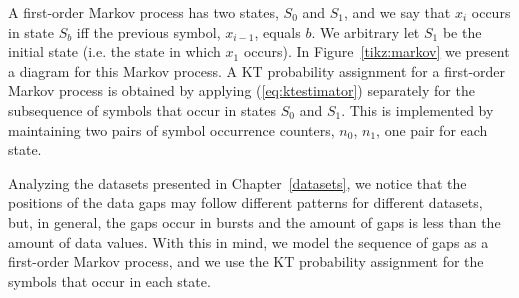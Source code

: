 \vspace{+5pt}
\begin{table}[h]
\begin{minipage}{0.62\textwidth}
A first-order Markov process has two states, $S_0$ and $S_1$, and we say that $x_i$ occurs in state $S_b$ iff the previous symbol, $x_{i-1}$, equals $b$. We arbitrary let $S_1$ be the initial state (i.e. the state in which $x_1$ occurs). In Figure~\ref{tikz:markov} we present a diagram for this Markov process. A KT probability assignment for a first-order Markov process is obtained by applying (\ref{eq:ktestimator}) separately for the subsequence of symbols that occur in states $S_0$ and $S_1$. This is implemented by maintaining two pairs of symbol occurrence counters, $n_0$, $n_1$, one pair for each state.

\end{minipage}%
\hspace{0.02\textwidth}
\begin{minipage}{0.32\textwidth}

\end{minipage}%
\end{table}


Analyzing the datasets presented in Chapter~\ref{datasets}, we notice that the positions of the data gaps may follow different patterns for different datasets, but, in general, the gaps occur in bursts and the amount of gaps is less than the amount of data values. With this in mind, we model the sequence of gaps as a first-order Markov process, and we use the KT probability assignment for the symbols that occur in each state.


